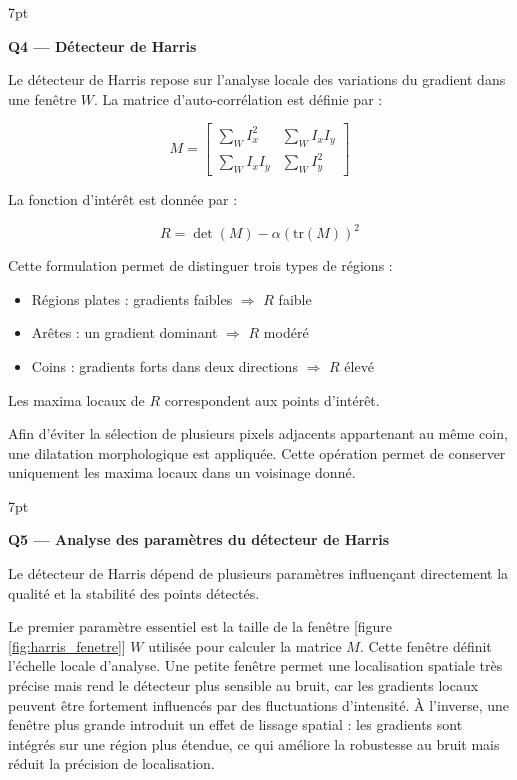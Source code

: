 \documentclass[11pt,a4paper]{article}
\newenvironment{formal}{%
	\def\FrameCommand{%
		\hspace{1pt}%
		{\color{enstaBleuFonce}\vrule width 2pt}%
		{\color{formalshade}\vrule width 4pt}%
		\colorbox{formalshade}%
	}%
	\MakeFramed{\advance\hsize-\width\FrameRestore}%
	\noindent\hspace{-4.55pt}%
	\begin{adjustwidth}{}{7pt}%
		\vspace{2pt}\vspace{2pt}%
	}
	{%
		\vspace{6pt}\end{adjustwidth}\endMakeFramed%
}
\begin{document}
	\begin{formal}
		\textbf{Q4 — Détecteur de Harris}
	\end{formal}
	
	Le détecteur de Harris repose sur l’analyse locale des variations du gradient dans une fenêtre $W$. La matrice d’auto-corrélation est définie par :
	
	$$
	M =
	\begin{bmatrix}
		\sum_W I_x^2 & \sum_W I_x I_y \\
		\sum_W I_x I_y & \sum_W I_y^2
	\end{bmatrix}
	$$
	
	La fonction d’intérêt est donnée par :
	
	$$
	R = \det(M) - \alpha (\mathrm{tr}(M))^2
	$$
	
	Cette formulation permet de distinguer trois types de régions :
	
	\begin{itemize}
		\item[-] Régions plates : gradients faibles $\Rightarrow$ $R$ faible
		\item[-] Arêtes : un gradient dominant $\Rightarrow$ $R$ modéré 
		\item[-] Coins : gradients forts dans deux directions $\Rightarrow$ $R$ élevé  
	\end{itemize}
	
	Les maxima locaux de $R$ correspondent aux points d’intérêt.
	
	Afin d’éviter la sélection de plusieurs pixels adjacents appartenant au même coin, une dilatation morphologique est appliquée. Cette opération permet de conserver uniquement les maxima locaux dans un voisinage donné.
	\begin{formal}
		\textbf{Q5 — Analyse des paramètres du détecteur de Harris}
	\end{formal}
	
	Le détecteur de Harris dépend de plusieurs paramètres influençant directement la qualité et la stabilité des points détectés.
	
	Le premier paramètre essentiel est la taille de la fenêtre [figure \ref{fig:harris_fenetre}] $W$ utilisée pour calculer la matrice $M$. Cette fenêtre définit l’échelle locale d’analyse. Une petite fenêtre permet une localisation spatiale très précise mais rend le détecteur plus sensible au bruit, car les gradients locaux peuvent être fortement influencés par des fluctuations d’intensité. À l’inverse, une fenêtre plus grande introduit un effet de lissage spatial : les gradients sont intégrés sur une région plus étendue, ce qui améliore la robustesse au bruit mais réduit la précision de localisation.
	
\end{document}
